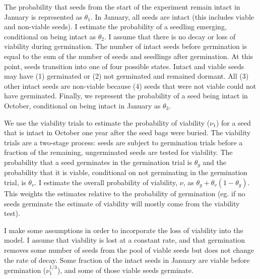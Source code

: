 \documentclass[12pt, oneside, titlepage]{article}   	%
\begin{document}
The probability that seeds from the start of the experiment remain intact in January is represented as $\theta_1$. In January, all seeds are intact (this includes viable and non-viable seeds). I estimate the probability of a seedling emerging, conditional on being intact as $\theta_2$. I assume that there is no decay or loss of viability during germination. The number of intact seeds before germination is equal to the sum of the number of seeds and seedlings after germination. At this point, seeds transition into one of four possible states. Intact and viable seeds may have (1) germinated or (2) not germinated and remained dormant. All (3) other intact seeds are non-viable because (4) seeds that were not viable could not have germinated. Finally, we represent the probability of a seed being intact in October, conditional on being intact in January as $\theta_3$.


We use the viability trials to estimate the probability of viability ($\nu_1$) for a seed that is intact in October one year after the seed bags were buried. The viability trials are a two-stage process: seeds are subject to germination trials before a fraction of the remaining, ungerminated seeds are tested for viability. The probability that a seed germinates in the germination trial is $\theta_g$ and the probability that it is viable, conditional on not germinating in the germination trial, is $\theta_v$. I estimate the overall probability of viability, $\nu$, as $\theta_g + \theta_v (1-\theta_g)$. This weights the estimates relative to the probability of germination (eg. if no seeds germinate the estimate of viability will mostly come from the viability test).

I make some assumptions in order to incorporate the loss of viability into the model. I assume that viability is lost at a constant rate, and that germination removes some number of seeds from the pool of viable seeds but does not change the rate of decay. Some fraction of the intact seeds in January are viable before germination ($\nu_1^{1/3}$), and some of those viable seeds germinate. 
\end{document}

